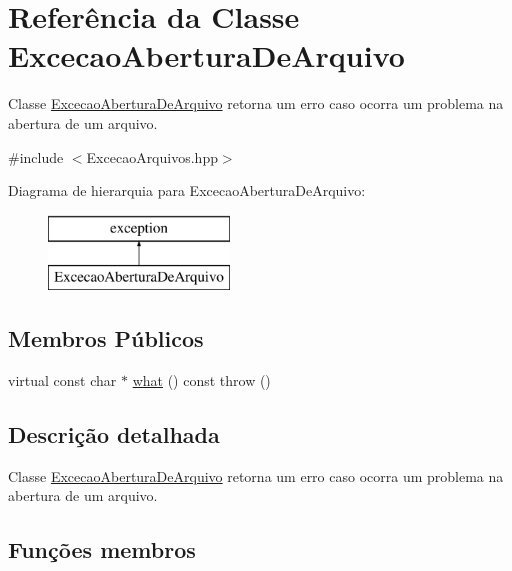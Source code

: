 \hypertarget{class_excecao_abertura_de_arquivo}{}\section{Referência da Classe Excecao\+Abertura\+De\+Arquivo}
\label{class_excecao_abertura_de_arquivo}


Classe \mbox{\hyperlink{class_excecao_abertura_de_arquivo}{Excecao\+Abertura\+De\+Arquivo}} retorna um erro caso ocorra um problema na abertura de um arquivo.  




{\ttfamily \#include $<$Excecao\+Arquivos.\+hpp$>$}

Diagrama de hierarquia para Excecao\+Abertura\+De\+Arquivo\+:\begin{figure}[H]
\begin{center}
\leavevmode
\includegraphics[height=2.000000cm]{class_excecao_abertura_de_arquivo}
\end{center}
\end{figure}
\subsection*{Membros Públicos}
\begin{DoxyCompactItemize}
\item 
virtual const char $\ast$ \mbox{\hyperlink{class_excecao_abertura_de_arquivo_a1b2d854305af0fafe2a8b1df0f30f003}{what}} () const  throw ()
\end{DoxyCompactItemize}


\subsection{Descrição detalhada}
Classe \mbox{\hyperlink{class_excecao_abertura_de_arquivo}{Excecao\+Abertura\+De\+Arquivo}} retorna um erro caso ocorra um problema na abertura de um arquivo. 

\subsection{Funções membros}
\mbox{\label{class_excecao_abertura_de_arquivo_a1b2d854305af0fafe2a8b1df0f30f003}} 
